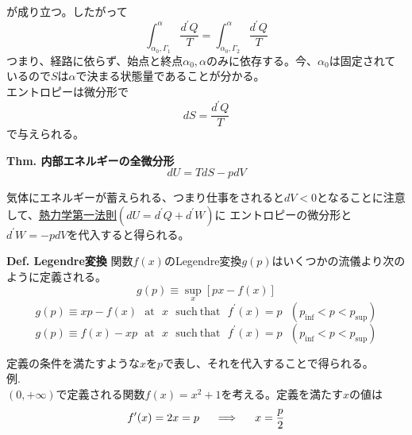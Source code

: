 \documentclass{jsarticle}
\begin{document}
が成り立つ。したがって
\begin{equation*}
    \int_{\alpha_{0},\Gamma_{1}}^{\alpha}\frac{d^{\prime}Q}{T}=\int_{\alpha_{0},\Gamma_{2}}^{\alpha}\frac{d^{\prime}Q}{T}
\end{equation*}
つまり、経路に依らず、始点と終点\(\alpha_{0},\alpha\)のみに依存する。今、\(\alpha_{0}\)は固定されているので\(S\)は\(\alpha\)で決まる状態量であることが分かる。\\
エントロピーは微分形で
\begin{equation*}
    dS=\frac{d^{\prime}Q}{T}
\end{equation*}
で与えられる。\\
\hypertarget{内部エネルギーの全微分形}{}
\begin{itembox}[l]{\textbf{Thm. 内部エネルギーの全微分形}}
    \begin{equation*}
        dU=TdS-pdV
    \end{equation*}
\end{itembox}
気体にエネルギーが蓄えられる、つまり仕事をされると\(dV<0\)となることに注意して、\hyperlink{熱力学第一法則}{熱力学第一法則}\((dU=d^{\prime}Q+d^{\prime}W)\)に
エントロピーの微分形と\(d^{\prime}W=-pdV\)を代入すると得られる。\\
\hypertarget{Legendre変換}{}
\begin{itembox}[l]{\textbf{Def. Legendre変換}}
    関数\(f(x)\)のLegendre変換\(g(p)\)はいくつかの流儀より次のように定義される。
    \begin{equation*}
        g(p)\equiv\sup_{x}[px-f(x)]
    \end{equation*}
    \begin{equation*}
        g(p)\equiv xp-f(x)~~~\mathrm{at}~~~x~~~\mathrm{such~that}~~~f^{\prime}(x)=p~~~(p_{\mathrm{inf}}<p<p_{\mathrm{sup}})
    \end{equation*}
    \begin{equation*}
        g(p)\equiv f(x)-xp~~~\mathrm{at}~~~x~~~\mathrm{such~that}~~~f^{\prime}(x)=p~~~(p_{\mathrm{inf}}<p<p_{\mathrm{sup}})
    \end{equation*}
\end{itembox}
定義の条件を満たすような\(x\)を\(p\)で表し、それを代入することで得られる。\\
例.\\
\((0,+\infty)\)で定義される関数\(f(x)=x^{2}+1\)を考える。定義を満たす\(x\)の値は
\begin{equation*}
    f^{\prime}(x)=2x=p\hspace{5mm}\Longrightarrow\hspace{5mm}x=\frac{p}{2}
\end{equation*}
\end{document}
